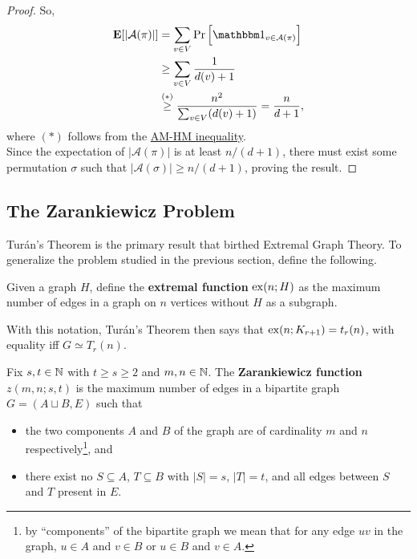 \documentclass{article}
\begin{document}
\begin{proof}
			So,
			\begin{align*}
				\expec[ |\mathcal{A}(\pi)| ] &= \sum_{v \in V} \Pr\left[ \indic_{v \in \mathcal{A}(\pi)} \right] \\
				&\ge \sum_{v \in V} \frac{1}{d(v) + 1} \\
				&\stackrel{\small{(*)}}{\ge} \frac{n^2}{\sum_{v \in V} (d(v) + 1)} = \frac{n}{d+1},
			\end{align*}
			where $(*)$ follows from the \href{https://en.wikipedia.org/wiki/HM-GM-AM-QM_inequalities}{AM-HM inequality}.\\
			Since the expectation of $|\mathcal{A}(\pi)|$ is at least $n/(d+1)$, there must exist some permutation $\sigma$ such that $|\mathcal{A}(\sigma)| \ge n/(d+1)$, proving the result.
		\end{proof}

	\subsection{The Zarankiewicz Problem}

		Tur\'{a}n's Theorem is the primary result that birthed Extremal Graph Theory. To generalize the problem studied in the previous section, define the following.

		\begin{fdef}
			Given a graph $H$, define the \textbf{extremal function} $\operatorname{ex}(n;H)$ as the maximum number of edges in a graph on $n$ vertices without $H$ as a subgraph.
		\end{fdef}

		With this notation, Tur\'{a}n's Theorem then says that $\operatorname{ex}(n;K_{r+1}) = t_r(n)$, with equality iff $G \simeq T_r(n)$.

		\begin{fdef}
			Fix $s, t \in \mathbb{N}$ with $t \ge s \ge 2$ and $m,n\in\mathbb{N}$.
			The \textbf{Zarankiewicz function} $z(m,n;s,t)$ is the maximum number of edges in a bipartite graph $G = (A \sqcup B, E)$ such that
			\begin{itemize}
				\item the two components $A$ and $B$ of the graph are of cardinality $m$ and $n$ respectively\footnote{by ``components'' of the bipartite graph we mean that for any edge $uv$ in the graph, $u\in A$ and $v\in B$ or $u \in B$ and $v\in A$.}, and
				\item there exist no $S \subseteq A$, $T \subseteq B$ with $|S|=s$, $|T|=t$, and all edges between $S$ and $T$ present in $E$.
			\end{itemize}
		\end{fdef}
\end{document}
